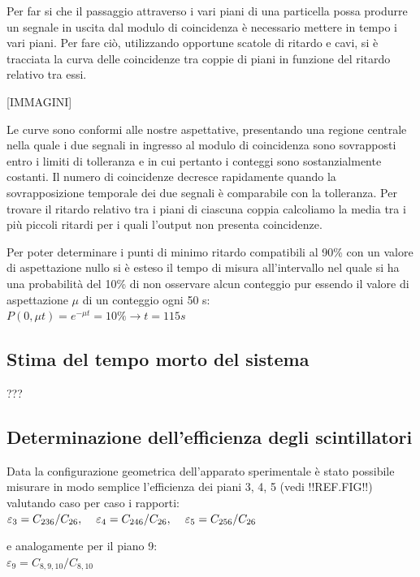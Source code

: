 \documentclass[11pt]{article}
\begin{document}
Per far si che il passaggio attraverso i vari piani di una particella possa produrre un segnale in uscita dal modulo di coincidenza è necessario mettere in tempo i vari piani. Per fare ciò, utilizzando opportune scatole di ritardo e cavi, si è tracciata la curva delle coincidenze tra coppie di piani in funzione del ritardo relativo tra essi.

[IMMAGINI]

Le curve sono conformi alle nostre aspettative, presentando una regione centrale nella quale i due segnali in ingresso al modulo di coincidenza sono sovrapposti entro i limiti di tolleranza e in cui pertanto i conteggi sono sostanzialmente costanti. 
Il numero di coincidenze decresce rapidamente quando la sovrapposizione temporale dei due segnali è comparabile con la tolleranza. Per trovare il ritardo relativo tra i piani di ciascuna coppia calcoliamo la media tra i più piccoli ritardi per i quali l'output non presenta coincidenze.

Per poter determinare i punti di minimo ritardo compatibili al 90\% con un valore di
aspettazione nullo si è esteso il tempo di misura all’intervallo nel quale si ha una probabilità del 10\% di non
osservare alcun conteggio pur essendo il valore di aspettazione $\mu$ di un conteggio ogni 50 s: \\

$
P(0, \mu t) = e^{−\mu t} = 10\% → t = 115 s
$

\subsection{Stima del tempo morto del sistema}
???

\subsection{Determinazione dell'efficienza degli scintillatori}
Data la configurazione geometrica dell'apparato sperimentale è stato possibile misurare in modo semplice l'efficienza dei piani 3, 4, 5 (vedi !!REF.FIG!!) valutando caso per caso i rapporti: \\
$
\varepsilon_3 = C_{236}/C_{26}, \hspace{0.4 cm} \varepsilon_4 = C_{246}/C_{26}, \hspace{0.4 cm} \varepsilon_5 = C_{256}/C_{26}
$

e analogamente per il piano 9: \\

$
\varepsilon_9 = C_{8,9,10}/C_{8,10}
$
\end{document}
